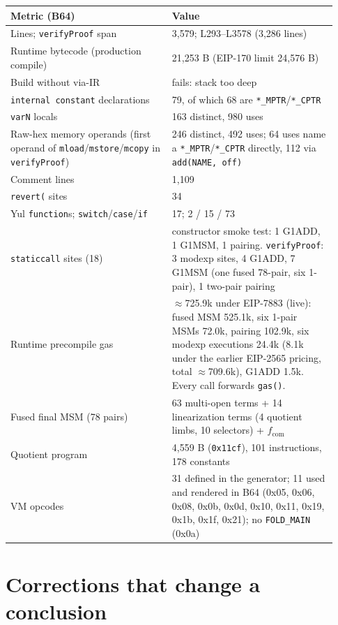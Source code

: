 \begin{center}\small
\begin{tabular}{@{}p{0.46\linewidth}p{0.47\linewidth}@{}}
\toprule
\textbf{Metric (B64)} & \textbf{Value} \\
\midrule
Lines; \texttt{verifyProof} span & 3{,}579; L293--L3578 (3{,}286 lines) \\
Runtime bytecode (production compile) & 21{,}253 B (EIP-170 limit 24{,}576 B) \\
Build without via-IR & fails: stack too deep \\
\texttt{internal constant} declarations & 79, of which 68 are \texttt{*\_MPTR}/\texttt{*\_CPTR} \\
\texttt{varN} locals & 163 distinct, 980 uses \\
Raw-hex memory operands (first operand of \texttt{mload}/\texttt{mstore}/\texttt{mcopy} in \texttt{verifyProof}) & 246 distinct, 492 uses; 64 uses name a \texttt{*\_MPTR}/\texttt{*\_CPTR} directly, 112 via \texttt{add(NAME, off)} \\
Comment lines & 1{,}109 \\
\texttt{revert(} sites & 34 \\
Yul \texttt{function}s; \texttt{switch}/\texttt{case}/\texttt{if} & 17; 2 / 15 / 73 \\
\texttt{staticcall} sites (18) & constructor smoke test: 1 G1ADD, 1 G1MSM, 1 pairing.
  \texttt{verifyProof}: 3 modexp sites, 4 G1ADD, 7 G1MSM (one fused 78-pair,
  six 1-pair), 1 two-pair pairing \\
Runtime precompile gas & $\approx$725.9k under EIP-7883 (live): fused MSM
  525.1k, six 1-pair MSMs 72.0k, pairing 102.9k, six modexp executions
  24.4k (8.1k under the earlier EIP-2565 pricing, total $\approx$709.6k),
  G1ADD 1.5k. Every call forwards \texttt{gas()}. \\
Fused final MSM (78 pairs) & 63 multi-open terms + 14 linearization terms
  (4 quotient limbs, 10 selectors) + $f_\text{com}$ \\
Quotient program & 4{,}559 B (\texttt{0x11cf}), 101 instructions,
  178 constants \\
VM opcodes & 31 defined in the generator; 11 used and rendered in B64
  (0x05, 0x06, 0x08, 0x0b, 0x0d, 0x10, 0x11, 0x19, 0x1b, 0x1f, 0x21); no
  \texttt{FOLD\_MAIN} (0x0a) \\
\bottomrule
\end{tabular}
\end{center}

\section{Corrections that change a conclusion}
\label{sec:vp-corrections}

